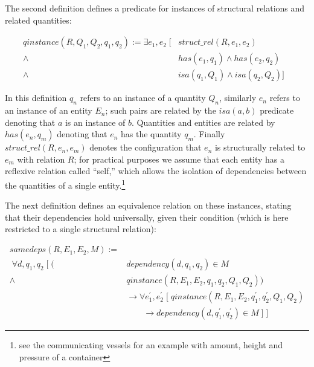 \documentclass{article} %
\begin{document}
The second definition defines a predicate for instances of structural relations
and related quantities:

\begin{align*}
qinstance(R, Q_1, Q_2, q_1, q_2) :=
	\exists e_1, e_2 \; [ &struct\_rel(R, e_1, e_2) & \\
	\land \; &has(e_1, q_1) \land has(e_2, q_2)  \\
	\land \; &isa(q_1, Q_1) \land isa(q_2, Q_2) ]
\end{align*}

In this definition $q_n$ refers to an instance of a quantity $Q_n$, similarly
$e_n$ refers to an instance of an entity $E_n$; such pairs are related by the
$isa(a, b)$ predicate denoting that $a$ is an instance of $b$. Quantities and
entities are related by $has(e_n, q_m)$ denoting that $e_n$ has the quantity
$q_m$. Finally $struct\_rel(R, e_n, e_m)$ denotes the configuration that $e_n$
is structurally related to $e_m$ with relation $R$; for practical purposes
we assume that each entity has a reflexive relation called ``self,'' which
allows the isolation of dependencies between the quantities of a single
entity.\footnote{see the communicating vessels for an example with amount,
height and pressure of a container} %

The next definition defines an equivalence relation on these instances,
stating that their dependencies hold universally, given their condition (which
is here restricted to a single structural relation):

\begin{align*}
samedeps(R, E_1, E_2, M) := \\
	\; \forall d, q_1, q_2 \; [ \; 
	(&dependency(d, q_1, q_2) \in M \\
	\land \; &qinstance(R, E_1, E_2, q_1, q_2, Q_1, Q_2)) \\
	& 	\rightarrow \forall e^\prime_1, e^\prime_2 \; [ \;
	 qinstance(R, E_1, E_2, q^\prime_1, q^\prime_2, Q_1, Q_2) \\
	& \qquad \rightarrow dependency(d, q^\prime_1, q^\prime_2) \in M \; ] \; ]
\end{align*}
\end{document}

